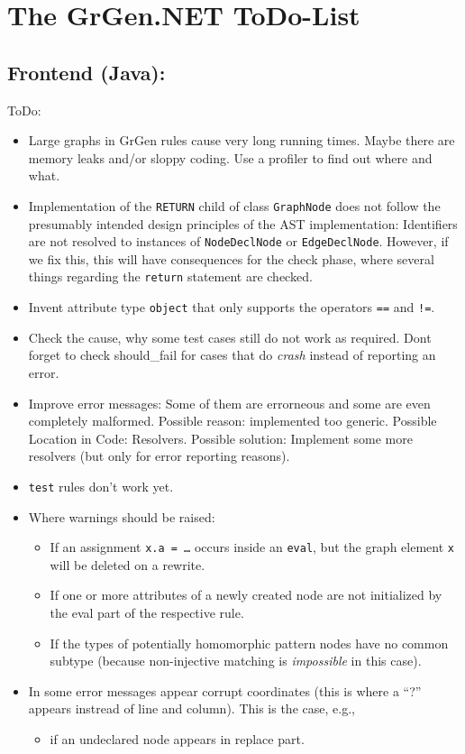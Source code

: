 \documentclass[12pt,a4paper]{article}
\begin{document}
\section*{\LARGE The GrGen.NET ToDo-List}



\subsection*{Frontend (Java):}
ToDo:
\begin{itemize}
	\item Large graphs in GrGen rules cause very long running times. Maybe there are memory leaks and/or sloppy coding.
		Use a profiler to find out where and what.
	\item
		Implementation of the {\tt RETURN} child of class {\tt GraphNode} does not follow the presumably intended design principles of the AST implementation:
		Identifiers are not resolved to instances of {\tt NodeDeclNode} or {\tt EdgeDeclNode}.
		However, if we fix this, this will have consequences for the check phase, where several things regarding the {\tt return} statement are checked.
	\item Invent attribute type {\tt object} that only supports the operators {\tt ==} and {\tt !=}.
	\item Check the cause, why some test cases still do not work as required.
		Dont forget to check should\_fail for cases that do \emph{crash} instead of reporting an error.
	\item Improve error messages: Some of them are errorneous and some are even completely malformed. Possible reason: implemented too generic. Possible Location in Code: Resolvers. Possible solution: Implement some more resolvers (but only for error reporting reasons).
    \item {\tt test} rules don't work yet.
	\item Where warnings should be raised:
		\begin{itemize}
			\item If an assignment {\tt x.a = \dots} occurs inside an {\tt eval}, but the graph element {\tt x} will be deleted on a rewrite.
			\item If one or more attributes of a newly created node are not initialized by the eval part of the respective rule.
			\item If the types of potentially homomorphic pattern nodes have no common subtype (because non-injective matching is \emph{impossible} in this case).
		\end{itemize}
	\item In some error messages appear corrupt coordinates (this is where a "`?"' appears instread of line and column).
		This is the case, e.g.,
		\begin{itemize}
			\item if an undeclared node appears in replace part.
		\end{itemize}
\end{itemize}
\end{document}
